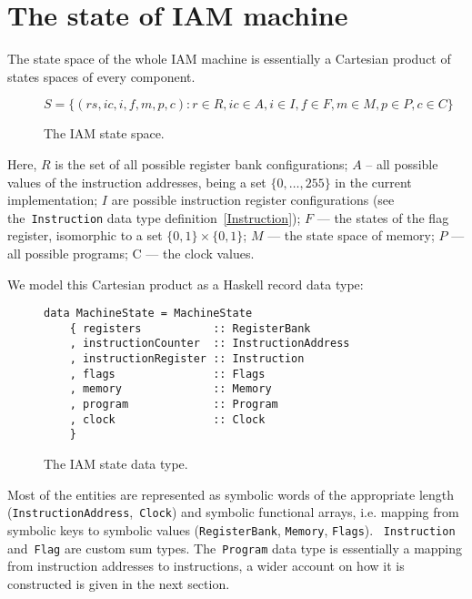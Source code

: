 \section{The state of IAM machine}

The state space of the whole IAM machine is essentially a Cartesian product of states spaces
of every component.

\begin{figure}[H]
\centering
$S = \{(rs, ic, i, f, m, p, c) : r \in R, ic \in A, i \in I, f \in F, m \in M, p \in P, c \in C\}$
\caption{The IAM state space.}
\label{stateSpace}
\end{figure}

Here, $R$ is the set of all possible register bank configurations; $A$ -- all possible values
of the instruction addresses, being a set $\{0,\ldots,255\}$ in the current implementation;
$I$ are possible instruction register configurations (see the~\texttt{Instruction} data type definition~\ref{Instruction}); $F$ --- the states of the flag register, isomorphic to a set
$\{0,1\} \times \{0,1\}$; $M$ --- the state space of memory; $P$ --- all possible programs; C --- the clock values.

We model this Cartesian product as a Haskell record data type:

\begin{figure}[H]
\begin{verbatim}
data MachineState = MachineState
    { registers           :: RegisterBank
    , instructionCounter  :: InstructionAddress
    , instructionRegister :: Instruction
    , flags               :: Flags
    , memory              :: Memory
    , program             :: Program
    , clock               :: Clock
    }
\end{verbatim}
\caption{The IAM state data type.}
\label{state}
\end{figure}

Most of the entities are represented as symbolic words of the appropriate
length (\texttt{InstructionAddress},~\texttt{Clock}) and
symbolic functional arrays, i.e. mapping from symbolic keys to symbolic
values (\texttt{RegisterBank}, \texttt{Memory}, \texttt{Flags}).
~\texttt{Instruction} and~\texttt{Flag} are custom sum types.
The~\texttt{Program} data type is essentially a mapping from instruction addresses to
instructions, a wider account on how it is constructed is given in the next section.